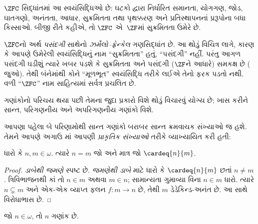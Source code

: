 \begin{defn}
$\ZFC$ સિદ્ધાંતમાં આ સ્વયંસિદ્ધિઓ છે: ઘટકો દ્વારા
નિર્ધારિત સમાનતા, યોગગણ, જોડ, ઘાતગણો, અનંતતા,
આધાર, સુક્રમિતતા તથા પૃથક્કરણ અને પ્રતિસ્થાપનનાં
પ્રરૂપોના બધા કિસ્સાઓ.
બીજી રીતે કહીએ, તો $\ZFC$ એ~$\ZF$માં સુક્રમિતતા
ઉમેરે છે.
\end{defn}

$\ZFC$નો અર્થ \emph{પસંદગી} સાથેનો
\emph{ઝર્મેલો--ફ્રેન્કેલ} ગણસિદ્ધાંત છે.
આ થોડું વિચિત્ર લાગે, કારણ કે આપણે ઉમેરેલી
સ્વયંસિદ્ધિનું નામ ``સુક્રમિતતા'' હતું, ``પસંદગી''
નહીં. પરંતુ આગળ {પસંદગી} ઘડીશું ત્યારે ખબર પડશે કે
સુક્રમિતતા અને પસંદગી ($\ZF$ને આધારે) સમકક્ષ છે
( જુઓ).
તેથી બંનેમાંથી કોને ``મૂળભૂત'' સ્વયંસિદ્ધિ તરીકે લઈએ
તેનો ફરક પડતો નથી. વળી ``$\ZFC$'' નામ
સાહિત્યમાં સર્વત્ર પ્રચલિત છે.
\endgroup

\begingroup
\makeatletter{}\makeatother

\label{guunit:OLP-0584}


ગણાંકોનો પરિચય થયા પછી તેમના જુદા પ્રકારો વિશે થોડું
વિચારવું યોગ્ય છે; ખાસ કરીને સાન્ત, પરિગણનીય
અને અપરિગણનીય ગણાંકો વિશે.

આપણા પહેલા બે પરિણામોથી સાન્ત ગણાંકો બરાબર સાન્ત
ક્રમવાચક સંખ્યાઓ જ હશે. તેમને આપણે અગાઉ
માં આપણી
\emph{પ્રાકૃતિક સંખ્યાઓ} તરીકે વ્યાખ્યાયિત કરી હતી:

\begin{prop}
ધારો કે $n, m \in \omega$. ત્યારે $n = m$ જો અને માત્ર જો
$\cardeq{n}{m}$.
\end{prop}

\begin{proof}
\emph{ડાબેથી જમણે} સ્પષ્ટ છે. \emph{જમણેથી ડાબે}
માટે ધારો કે $\cardeq{n}{m}$ છતાં $n \neq m$.
ત્રિવિભાજનથી કાં તો $n \in m$ અથવા $m \in n$;
સામાન્યતા ગુમાવ્યા વિના $n \in m$ ધારો.
ત્યારે $n \subsetneq m$ અને
એક-એક વ્યાપ્ત ફલન $f \colon m \to n$ છે, તેથી $m$
ડેડેકિન્ડ-અનંત છે. આ
સાથે વિરોધાભાસ છે.
\end{proof}

\begin{cor}
જો $n \in \omega$, તો $n$ ગણાંક છે.
\end{cor}

